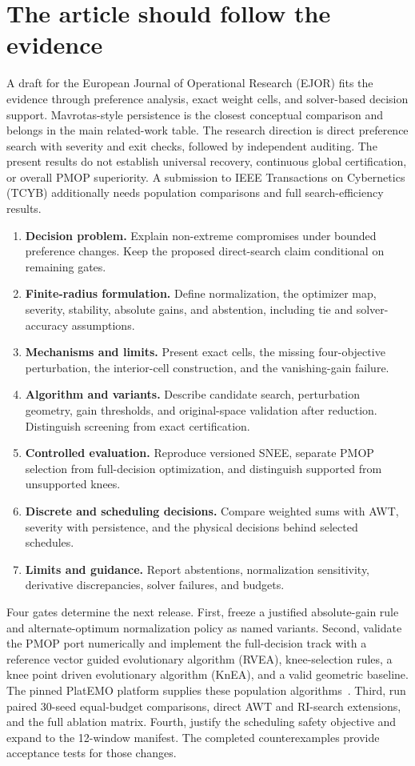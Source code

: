 \documentclass[11pt]{article}
\begin{document}
\section{The article should follow the evidence}\label{sec:outline}
A draft for the European Journal of Operational Research (EJOR) fits the evidence through preference analysis, exact weight cells, and solver-based decision support.
Mavrotas-style persistence is the closest conceptual comparison and belongs in the main related-work table.
The research direction is direct preference search with severity and exit checks, followed by independent auditing.
The present results do not establish universal recovery, continuous global certification, or overall PMOP superiority.
A submission to IEEE Transactions on Cybernetics (TCYB) additionally needs population comparisons and full search-efficiency results.
\begin{enumerate}
\item \textbf{Decision problem.} Explain non-extreme compromises under bounded preference changes. Keep the proposed direct-search claim conditional on remaining gates.
\item \textbf{Finite-radius formulation.} Define normalization, the optimizer map, severity, stability, absolute gains, and abstention, including tie and solver-accuracy assumptions.
\item \textbf{Mechanisms and limits.} Present exact cells, the missing four-objective perturbation, the interior-cell construction, and the vanishing-gain failure.
\item \textbf{Algorithm and variants.} Describe candidate search, perturbation geometry, gain thresholds, and original-space validation after reduction. Distinguish screening from exact certification.
\item \textbf{Controlled evaluation.} Reproduce versioned SNEE, separate PMOP selection from full-decision optimization, and distinguish supported from unsupported knees.
\item \textbf{Discrete and scheduling decisions.} Compare weighted sums with AWT, severity with persistence, and the physical decisions behind selected schedules.
\item \textbf{Limits and guidance.} Report abstentions, normalization sensitivity, derivative discrepancies, solver failures, and budgets.
\end{enumerate}

Four gates determine the next release.
First, freeze a justified absolute-gain rule and alternate-optimum normalization policy as named variants.
Second, validate the PMOP port numerically and implement the full-decision track with a reference vector guided evolutionary algorithm (RVEA), knee-selection rules, a knee point driven evolutionary algorithm (KnEA), and a valid geometric baseline. The pinned PlatEMO platform supplies these population algorithms~\cite{platemo}.
Third, run paired 30-seed equal-budget comparisons, direct AWT and RI-search extensions, and the full ablation matrix.
Fourth, justify the scheduling safety objective and expand to the 12-window manifest.
The completed counterexamples provide acceptance tests for those changes.
\end{document}
